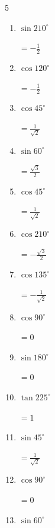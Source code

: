 \begin{multicols}{5}
\begin{enumerate}
        $\displaystyle =-1$

  \item $\displaystyle \sin{210^\circ}$

        $\displaystyle =-\frac{1}{2}$

\columnbreak %

  \item $\displaystyle \cos{120^\circ}$

        $\displaystyle =-\frac{1}{2}$

  \item $\displaystyle \cos{45^\circ}$

        $\displaystyle =\frac{1}{\sqrt{2}}$

  \item $\displaystyle \sin{60^\circ}$

        $\displaystyle =\frac{\sqrt{3}}{2}$

  \item $\displaystyle \cos{45^\circ}$

        $\displaystyle =\frac{1}{\sqrt{2}}$

  \item $\displaystyle \cos{210^\circ}$

        $\displaystyle =-\frac{\sqrt{3}}{2}$

  \item $\displaystyle \cos{135^\circ}$

        $\displaystyle =-\frac{1}{\sqrt{2}}$

  \item $\displaystyle \cos{90^\circ}$

        $\displaystyle =0$

  \item $\displaystyle \sin{180^\circ}$

        $\displaystyle =0$

  \item $\displaystyle \tan{225^\circ}$

        $\displaystyle =1$

  \item $\displaystyle \sin{45^\circ}$

        $\displaystyle =\frac{1}{\sqrt{2}}$

  \item $\displaystyle \cos{90^\circ}$

        $\displaystyle =0$

  \item $\displaystyle \sin{60^\circ}$


\end{enumerate}
\end{multicols}
